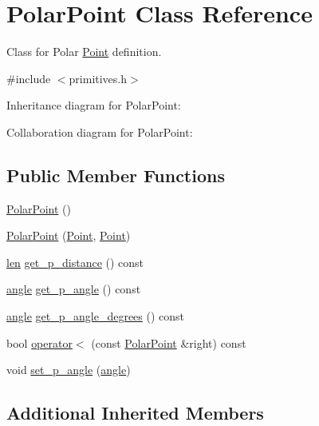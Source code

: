 \hypertarget{class_polar_point}{}\section{Polar\+Point Class Reference}
\label{class_polar_point}


Class for Polar \mbox{\hyperlink{class_point}{Point}} definition.  




{\ttfamily \#include $<$primitives.\+h$>$}



Inheritance diagram for Polar\+Point\+:


Collaboration diagram for Polar\+Point\+:
\subsection*{Public Member Functions}
\begin{DoxyCompactItemize}
\item 
\mbox{\hyperlink{class_polar_point_aa5dc669fa33f48c9dccd235751cb8db5}{Polar\+Point}} ()
\item 
\mbox{\hyperlink{class_polar_point_a85656b69c29c9f60781dd734926863b6}{Polar\+Point}} (\mbox{\hyperlink{class_point}{Point}}, \mbox{\hyperlink{class_point}{Point}})
\item 
\mbox{\hyperlink{primitives_8h_a0daa439ba651ea0fd8d02392244db601}{len}} \mbox{\hyperlink{class_polar_point_afb68d253c45fe88bc49fafcf81ec2276}{get\+\_\+p\+\_\+distance}} () const
\item 
\mbox{\hyperlink{primitives_8h_a41ee332ff1a31807cb838b616c186dd7}{angle}} \mbox{\hyperlink{class_polar_point_a5918f355697069f0e54e924673c7a872}{get\+\_\+p\+\_\+angle}} () const
\item 
\mbox{\hyperlink{primitives_8h_a41ee332ff1a31807cb838b616c186dd7}{angle}} \mbox{\hyperlink{class_polar_point_a32537087535c21aee75a7799c168645d}{get\+\_\+p\+\_\+angle\+\_\+degrees}} () const
\item 
bool \mbox{\hyperlink{class_polar_point_a705e9afe8f23c0cac34b25a006c574e8}{operator$<$}} (const \mbox{\hyperlink{class_polar_point}{Polar\+Point}} \&right) const
\item 
void \mbox{\hyperlink{class_polar_point_ac63f2017507c73c4bd3c5f89994627ef}{set\+\_\+p\+\_\+angle}} (\mbox{\hyperlink{primitives_8h_a41ee332ff1a31807cb838b616c186dd7}{angle}})
\end{DoxyCompactItemize}
\subsection*{Additional Inherited Members}


